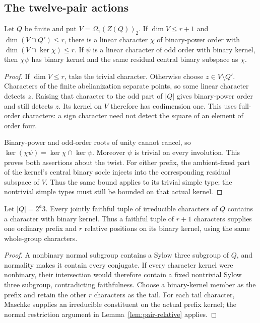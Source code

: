 \subsection{The twelve-pair actions}

\begin{lemma}\label{lem:binary-primary-prefix}
Let $Q$ be finite and put $V=\Omega_1(Z(Q))_2$. If
$\dim V\leq r+1$ and $\dim(V\cap Q')\leq r$, there is a linear
character $\chi$ of binary-power order with
$\dim(V\cap\ker\chi)\leq r$.
If $\psi$ is a linear character of odd order with binary kernel,
then $\chi\psi$ has binary kernel and the same residual central
binary subspace as $\chi$.
\end{lemma}
\begin{proof}
If $\dim V\leq r$, take the trivial character. Otherwise choose
$z\in V\setminus Q'$. Characters of the finite abelianization
separate points, so some linear character detects $z$. Raising
that character to the odd part of $|Q|$ gives binary-power order
and still detects $z$. Its kernel on $V$ therefore has codimension
one. This uses full-order characters: a sign character need not
detect the square of an element of order four.

Binary-power and odd-order roots of unity cannot cancel, so
$\ker(\chi\psi)=\ker\chi\cap\ker\psi$. Moreover $\psi$ is
trivial on every involution. This proves both assertions about
the twist. For either prefix, the ambient-fixed part of the
kernel's central binary socle injects into the corresponding
residual subspace of $V$. Thus the same bound applies to its
trivial simple type; the nontrivial simple types must still be
bounded on that actual kernel.
\end{proof}

\begin{lemma}\label{lem:ternary-odd-part-anchor}
Let $|Q|=2^a3$. Every jointly faithful tuple of irreducible characters
of $Q$ contains a character with binary kernel. Thus a faithful tuple
of $r+1$ characters supplies one ordinary prefix and $r$ relative
positions on its binary kernel, using the same whole-group characters.
\end{lemma}
\begin{proof}
A nonbinary normal subgroup contains a Sylow three subgroup of $Q$,
and normality makes it contain every conjugate. If every character
kernel were nonbinary, their intersection would therefore contain a
fixed nontrivial Sylow three subgroup, contradicting faithfulness.
Choose a binary-kernel member as the prefix and retain the other
$r$ characters as the tail. For each tail character, Maschke supplies
an irreducible constituent on the actual prefix kernel; the normal
restriction argument in Lemma~\ref{lem:pair-relative} applies.
\end{proof}

